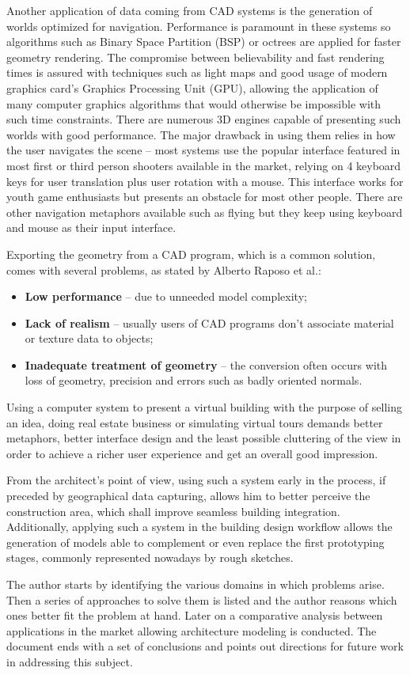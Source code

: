 Another application of data coming from CAD systems is the generation of worlds optimized for navigation.
Performance is paramount in these systems so algorithms such as Binary Space Partition (BSP)
or octrees are applied for faster geometry rendering.
The compromise between believability and fast rendering times is assured with techniques such as
light maps and good usage of modern graphics card's Graphics Processing Unit (GPU),
allowing the application of many computer graphics algorithms that would otherwise be impossible
with such time constraints.
There are numerous 3D engines capable of presenting such worlds with good performance.
The major drawback in using them relies in how the user navigates the scene --
most systems use the popular interface featured in most first or third person shooters
available in the market,
relying on 4 keyboard keys for user translation plus user rotation with a mouse.
This interface works for youth game enthusiasts but presents an obstacle for most other people.
There are other navigation metaphors available such as flying but they keep using keyboard and mouse
as their input interface.

Exporting the geometry from a CAD program, which is a common solution, comes with several problems,
as stated by Alberto Raposo et al.\cite{CADVR06}:
\begin{itemize}
	\item \textbf{Low performance} -- due to unneeded model complexity;
	\item \textbf{Lack of realism} -- usually users of CAD programs don't associate material
	or texture data to objects;
	\item \textbf{Inadequate treatment of geometry} -- the conversion often occurs with loss of
	geometry, precision and errors such as badly oriented normals.
\end{itemize}

Using a computer system to present a virtual building with the purpose of selling an idea,
doing real estate business or simulating virtual tours demands better metaphors,
better interface design and the least possible cluttering of the view in order
to achieve a richer user experience and get an overall good impression.

From the architect's point of view, using such a system early in the process,
if preceded by geographical data capturing,
allows him to better perceive the construction area, which shall improve seamless building integration.
Additionally, applying such a system in the building design workflow allows the generation
of models able to complement or even replace the first prototyping stages,
commonly represented nowadays by rough sketches.

The author starts by identifying the various domains in which problems arise.
Then a series of approaches to solve them is listed and the author reasons which ones better fit
the problem at hand.
Later on a comparative analysis between applications in the market allowing architecture modeling is conducted.
The document ends with a set of conclusions and points out directions for future work in
addressing this subject.
